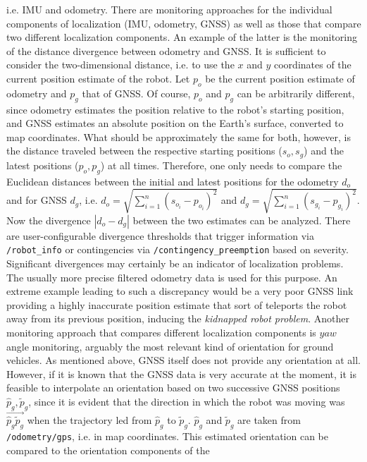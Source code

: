 \documentclass[english, master, utf8]{base/thesis_KBS}
\newcommand{\code}[1]{\colorbox{light-gray}{\texttt{#1}}}
\begin{document}
i.e. IMU and odometry.\newline
There are monitoring approaches for the individual components of localization (IMU, odometry, GNSS) as well as those that compare two different localization components.
An example of the latter is the monitoring of the distance divergence between odometry and GNSS. It is sufficient to consider the two-dimensional distance, i.e. to use the $x$ and
$y$ coordinates of the current position estimate of the robot. Let $p_o$ be the current position estimate of odometry and $p_g$ that of GNSS. Of course, $p_o$ and $p_g$ can be
arbitrarily different, since odometry estimates the position relative to the robot's starting position, and GNSS estimates an absolute position on the Earth's surface, converted to
map coordinates. What should be approximately the same for both, however, is the distance traveled between the respective starting positions ($s_o, s_g$) and the latest positions
($p_o, p_g$) at all times. Therefore, one only needs to compare the Euclidean distances between the initial and latest positions for the odometry $d_o$ and for GNSS $d_g$,
i.e. $d_o = \sqrt{\sum_{i=1}^{n}(s_{o_i} - p_{o_i})^2}$ and $d_g = \sqrt{\sum_{i=1}^{n}(s_{g_i} - p_{g_i})^2}$. Now the divergence $|d_o - d_g|$ between the two estimates can be analyzed.
There are user-configurable divergence thresholds that trigger information via \code{/robot\_info} or contingencies via \code{/contingency\_preemption} based on severity. Significant
divergences may certainly be an indicator of localization problems. The usually more precise filtered odometry data is used for this purpose.
An extreme example leading to such a discrepancy would be a very poor GNSS link providing a highly inaccurate
position estimate that sort of teleports the robot away from its previous position, inducing the \textit{kidnapped robot problem}. Another monitoring approach that compares different
localization components is $yaw$ angle monitoring, arguably the most relevant kind of orientation for
ground vehicles. As mentioned above, GNSS itself does not provide any orientation at all. However, if it is known that the GNSS data is very accurate at the moment, it is feasible
to interpolate an orientation based on two successive GNSS positions $\hat{p}_g, \tilde{p}_g$, since it is evident that the direction in which the robot was moving was
$\overrightarrow{\hat{p}_g\tilde{p}_g}$ when the trajectory led from $\hat{p}_g$ to $\tilde{p}_g$. $\hat{p}_g$ and $\tilde{p}_g$ are taken from \code{/odometry/gps}, i.e. in map
coordinates. This estimated orientation can be compared to the orientation components of the
\end{document}
